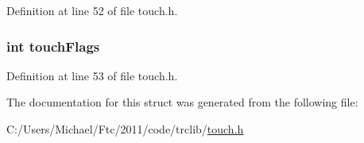 Definition at line 52 of file touch.h.

\hypertarget{struct_t_o_u_c_h_a123437254b30d7234872a05229e1d079}{
\subsubsection[{touchFlags}]{\setlength{\rightskip}{0pt plus 5cm}int {\bf touchFlags}}}
\label{struct_t_o_u_c_h_a123437254b30d7234872a05229e1d079}


Definition at line 53 of file touch.h.



The documentation for this struct was generated from the following file:\begin{DoxyCompactItemize}
\item 
C:/Users/Michael/Ftc/2011/code/trclib/\hyperlink{touch_8h}{touch.h}\end{DoxyCompactItemize}
